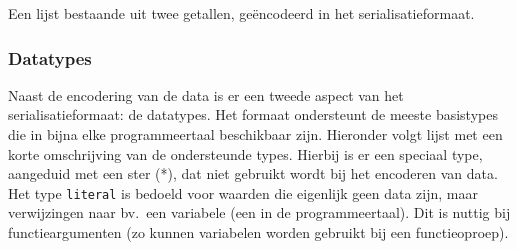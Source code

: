 \begin{listing}
    \inputminted{json}{code/format.json}
    \caption{Een lijst bestaande uit twee getallen, geëncodeerd in het serialisatieformaat.}
    \label{lst:serialisation}
\end{listing}

\subsubsection{Datatypes}

Naast de encodering van de data is er een tweede aspect van het serialisatieformaat: de datatypes.
Het formaat ondersteunt de meeste basistypes die in bijna elke programmeertaal beschikbaar zijn.
Hieronder volgt lijst met een korte omschrijving van de ondersteunde types.
Hierbij is er een speciaal type, aangeduid met een ster (*), dat niet gebruikt wordt bij het encoderen van data.
Het type \texttt{literal} is bedoeld voor waarden die eigenlijk geen data zijn, maar verwijzingen naar bv.\ een variabele (een  in de programmeertaal).
Dit is nuttig bij functieargumenten (zo kunnen variabelen worden gebruikt bij een functieoproep).

